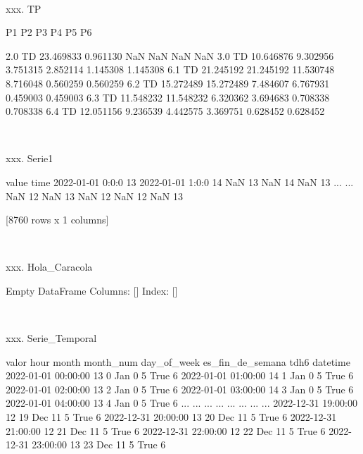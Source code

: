 \documentclass[a4paper,10pt]{article}
\begin{document}
\begin{Form}
\

xxx. TP

               P1         P2         P3        P4        P5        P6
                                                                     
2.0 TD  23.469833   0.961130        NaN       NaN       NaN       NaN
3.0 TD  10.646876   9.302956   3.751315  2.852114  1.145308  1.145308
6.1 TD  21.245192  21.245192  11.530748  8.716048  0.560259  0.560259
6.2 TD  15.272489  15.272489   7.484607  6.767931  0.459003  0.459003
6.3 TD  11.548232  11.548232   6.320362  3.694683  0.708338  0.708338
6.4 TD  12.051156   9.236539   4.442575  3.369751  0.628452  0.628452 \

\

xxx. Serie1

                  value
time                   
2022-01-01 0:0:0     13
2022-01-01 1:0:0     14
NaN                  13
NaN                  14
NaN                  13
...                 ...
NaN                  12
NaN                  13
NaN                  12
NaN                  12
NaN                  13

[8760 rows x 1 columns] \

\

xxx. Hola_Caracola

Empty DataFrame
Columns: []
Index: [] \

\

xxx. Serie_Temporal

                     valor  hour month  month_num  day_of_week  es_fin_de_semana  tdh6
datetime                                                                              
2022-01-01 00:00:00     13     0   Jan          0            5              True     6
2022-01-01 01:00:00     14     1   Jan          0            5              True     6
2022-01-01 02:00:00     13     2   Jan          0            5              True     6
2022-01-01 03:00:00     14     3   Jan          0            5              True     6
2022-01-01 04:00:00     13     4   Jan          0            5              True     6
...                    ...   ...   ...        ...          ...               ...   ...
2022-12-31 19:00:00     12    19   Dec         11            5              True     6
2022-12-31 20:00:00     13    20   Dec         11            5              True     6
2022-12-31 21:00:00     12    21   Dec         11            5              True     6
2022-12-31 22:00:00     12    22   Dec         11            5              True     6
2022-12-31 23:00:00     13    23   Dec         11            5              True     6


\end{Form}
\end{document}
